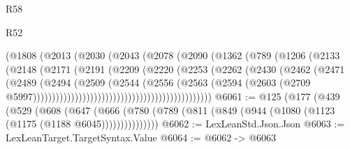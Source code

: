 \begin{lexlean}{R58}
\begin{lexlean}{R52}
\begin{coremodule}
{{{{{{{{{{{{{{{{{{{{{{{{{{{{{{{{{{{{{{{{{{{{{{{{{{{{{{{{{{{{{{{{{{{{{{{{{{{{{{{{{{{{{{{{{{{{{{{{{{{{{{{{{{{{{{{{{{{{{{{{{{{{{{{{{{{{{{{{{{{{{{{{{{{{{{{{{{{{{{{{{{{{{{{{{{{{{{{{{{{{{{{{{{{{{{{{{{{{{{                                        (@1808
                                          (@2013
                                            (@2030
                                              (@2043
                                                (@2078
                                                  (@2090
                                                    (@1362
                                                      (@789
                                                        (@1206
                                                          (@2133
                                                            (@2148
                                                              (@2171
                                                                (@2191
                                                                  (@2209
                                                                    (@2220
                                                                      (@2253
                                                                        (@2262
                                                                          (@2430
                                                                            (@2462
                                                                              (@2471
                                                                                (@2489
                                                                                  (@2494
                                                                                    (@2509
                                                                                      (@2544
                                                                                        (@2556
                                                                                          (@2563
                                                                                            (@2594
                                                                                              (@2603
                                                                                                (@2709
                                                                                                  @5997)))))))))))))))))))))))))))))))))))))))))))))))
@6061 := @125
    (@177
      (@439
        (@529
          (@608
            (@647
              (@666 (@780 (@789 (@811 (@849 (@944 (@1080 (@1123 (@1175 (@1188 @6045)))))))))))))))
@6062 := LexLeanStd.Json.Json
@6063 := LexLeanTarget.TargetSyntax.Value
@6064 := @6062 -> @6063
}}}}}}}}}}}}}}}}}}}}}}}}}}}}}}}}}}}}}}}}}}}}}}}}}}}}}}}}}}}}}}}}}}}}}}}}}}}}}}}}}}}}}}}}}}}}}}}}}}}}}}}}}}}}}}}}}}}}}}}}}}}}}}}}}}}}}}}}}}}}}}}}}}}}}}}}}}}}}}}}}}}}}}}}}}}}}}}}}}}}}}}}}}}}}}}}}}}}}}
\end{coremodule}
\end{lexlean}
\end{lexlean}
